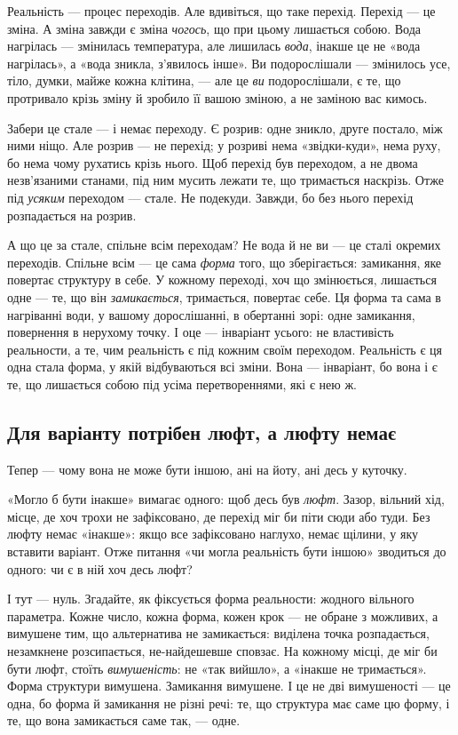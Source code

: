 \documentclass[12pt, a4paper, openany]{book}
\begin{document}
Реальність --- процес переходів. Але вдивіться, що таке перехід. Перехід --- це зміна. А зміна завжди є зміна \emph{чогось}, що при цьому лишається собою. Вода нагрілась --- змінилась температура, але лишилась \emph{вода}, інакше це не «вода нагрілась», а «вода зникла, з'явилось інше». Ви подорослішали --- змінилось усе, тіло, думки, майже кожна клітина, --- але це \emph{ви} подорослішали, є те, що протривало крізь зміну й зробило її вашою зміною, а не заміною вас кимось.

Забери це стале --- і немає переходу. Є розрив: одне зникло, друге постало, між ними ніщо. Але розрив --- не перехід; у розриві нема «звідки-куди», нема руху, бо нема чому рухатись крізь нього. Щоб перехід був переходом, а не двома незв'язаними станами, під ним мусить лежати те, що тримається наскрізь. Отже під \emph{усяким} переходом --- стале. Не подекуди. Завжди, бо без нього перехід розпадається на розрив.

А що це за стале, спільне всім переходам? Не вода й не ви --- це сталі окремих переходів. Спільне всім --- це сама \emph{форма} того, що зберігається: замикання, яке повертає структуру в себе. У кожному переході, хоч що змінюється, лишається одне --- те, що він \emph{замикається}, тримається, повертає себе. Ця форма та сама в нагріванні води, у вашому дорослішанні, в обертанні зорі: одне замикання, повернення в нерухому точку. І оце --- інваріант усього: не властивість реальности, а те, чим реальність є під кожним своїм переходом. Реальність є ця одна стала форма, у якій відбуваються всі зміни. Вона --- інваріант, бо вона і є те, що лишається собою під усіма перетвореннями, які є нею ж.

\subsection{Для варіанту потрібен люфт, а люфту немає}

Тепер --- чому вона не може бути іншою, ані на йоту, ані десь у куточку.

«Могло б бути інакше» вимагає одного: щоб десь був \emph{люфт}. Зазор, вільний хід, місце, де хоч трохи не зафіксовано, де перехід міг би піти сюди або туди. Без люфту немає «інакше»: якщо все зафіксовано наглухо, немає щілини, у яку вставити варіант. Отже питання «чи могла реальність бути іншою» зводиться до одного: чи є в ній хоч десь люфт?

І тут --- нуль. Згадайте, як фіксується форма реальности: жодного вільного параметра. Кожне число, кожна форма, кожен крок --- не обране з можливих, а вимушене тим, що альтернатива не замикається: виділена точка розпадається, незамкнене розсипається, не-найдешевше сповзає. На кожному місці, де міг би бути люфт, стоїть \emph{вимушеність}: не «так вийшло», а «інакше не тримається». Форма структури вимушена. Замикання вимушене. І це не дві вимушеності --- це одна, бо форма й замикання не різні речі: те, що структура має саме цю форму, і те, що вона замикається саме так, --- одне.
\end{document}
